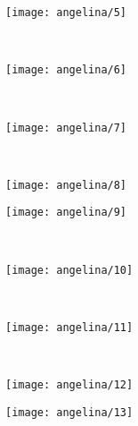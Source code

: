 \begin{figure}
        \begin{subfigure}[b]{0.2\textwidth}
                \centering
                \texttt{[image: angelina/5]}
        \end{subfigure}%
        ~ %
        \begin{subfigure}[b]{0.2\textwidth}
                \centering
                \texttt{[image: angelina/6]}
        \end{subfigure}
        ~
        \begin{subfigure}[b]{0.2\textwidth}
                \centering
                \texttt{[image: angelina/7]}
        \end{subfigure}%
        ~ %
        \begin{subfigure}[b]{0.2\textwidth}
                \centering
                \texttt{[image: angelina/8]}
        \end{subfigure}
%
        \begin{subfigure}[b]{0.2\textwidth}
                \centering
                \texttt{[image: angelina/9]}
        \end{subfigure}%
        ~ %
        \begin{subfigure}[b]{0.2\textwidth}
                \centering
                \texttt{[image: angelina/10]}
        \end{subfigure}
        ~
        \begin{subfigure}[b]{0.2\textwidth}
                \centering
                \texttt{[image: angelina/11]}
        \end{subfigure}%
        ~ %
        \begin{subfigure}[b]{0.2\textwidth}
                \centering
                \texttt{[image: angelina/12]}
        \end{subfigure}
%
        \begin{subfigure}[b]{0.2\textwidth}
                \centering
                \texttt{[image: angelina/13]}
        \end{subfigure}%
        ~ %
        \begin{subfigure}[b]{0.2\textwidth}

\end{subfigure}
\end{figure}
